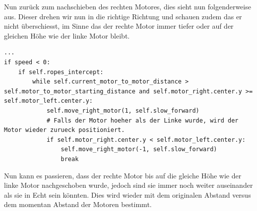 \documentclass[12pt]{article}
\begin{document}
Nun zurück zum nachschieben des rechten Motores, dies sieht nun folgenderweise aus. Dieser drehen wir nun in die richtige Richtung und schauen zudem das er nicht überschiesst, im Sinne das der rechte Motor immer tiefer oder auf der gleichen Höhe wie der linke Motor bleibt.
\begin{lstlisting}
...
if speed < 0:
	if self.ropes_intercept:
		while self.current_motor_to_motor_distance > self.motor_to_motor_starting_distance and self.motor_right.center.y >= self.motor_left.center.y:
			self.move_right_motor(1, self.slow_forward)
			# Falls der Motor hoeher als der Linke wurde, wird der Motor wieder zurueck positioniert.
			if self.motor_right.center.y < self.motor_left.center.y:
				self.move_right_motor(-1, self.slow_forward)
				break
\end{lstlisting}

Nun kann es passieren, dass der rechte Motor bis auf die gleiche Höhe wie der linke Motor nachgeschoben wurde, jedoch sind sie immer noch weiter auseinander als sie in Echt sein könnten. Dies wird wieder mit dem originalen Abstand versus dem momentan Abstand der Motoren bestimmt.
\end{document}
